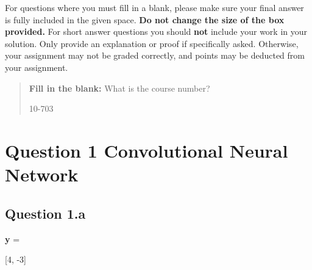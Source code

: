 \documentclass[12pt]{article}
\begin{document}
For questions where you must fill in a blank, please make sure your final answer is fully included in the given space.  \textbf{Do not change the size of the box provided.}  For short answer questions you should \textbf{not} include your work in your solution.  Only provide an explanation or proof if specifically asked.  Otherwise, your assignment may not be graded correctly, and points may be deducted from your assignment.

\begin{quote}
\textbf{Fill in the blank:} What is the course number?

\begin{tcolorbox}[fit,height=1cm, width=4cm, blank, borderline={1pt}{-2pt},nobeforeafter]
    \begin{center}\huge10-703\end{center}
    \end{tcolorbox}
\end{quote}


\newpage
\section*{Question 1 Convolutional Neural Network}
\subsection*{Question 1.a}
    \qquad 
    \textbf{y} =  \begin{tcolorbox}[fit,height=1cm, width=6cm, blank, borderline={1pt}{1pt},nobeforeafter]
            \begin{center}
            \vspace{3mm}
            [4, -3]
            \end{center}
            \end{tcolorbox}
\end{document}
